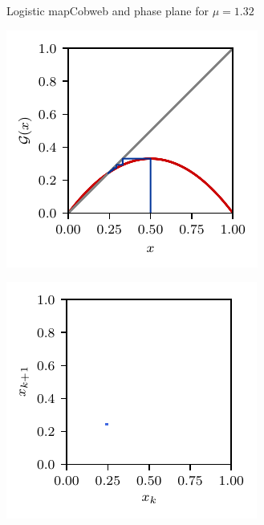\documentclass[usenames,dvipsnames,svgnames,10pt,aspectratio=169]{beamer}
\begin{document}
\begin{frame}[t, c]{Logistic map}{Cobweb and phase plane for $\mu = 1.32$}
	\begin{minipage}{.48\textwidth}
		\centering
		\includegraphics[width=.75\textwidth]{logistic_map_cobweb_plot_1}
	\end{minipage}%
	\begin{minipage}{.48\textwidth}
		\centering
		\includegraphics[width=.75\textwidth]{logistic_map_phase_plane_1}
	\end{minipage}

	\vspace{1cm}
\end{frame}
\end{document}
